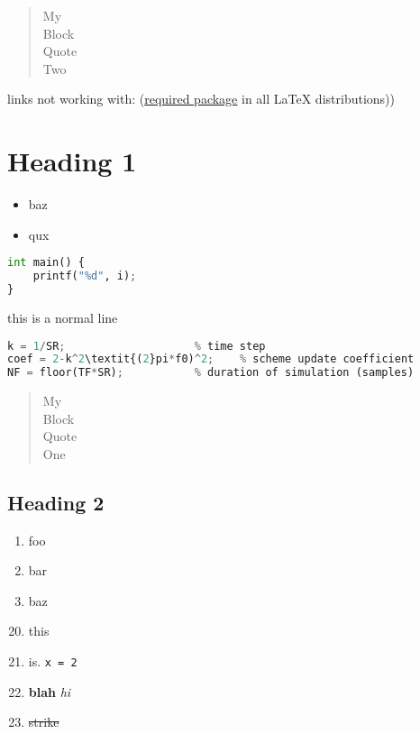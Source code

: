 \documentclass{article}
\begin{document}
 
\setcounter{secnumdepth}{0}

\begin{quote}
    My\\
    Block\\
    Quote\\
    Two
\end{quote}

links not working with: (\href{https://ctan.org/pkg/required}{required package} in all LaTeX distributions))
\section{Heading 1}

\begin{itemize}
    \item baz
    \item qux
\end{itemize}

\begin{lstlisting}[language=python, style=myStyle]
int main() {
    printf("%d", i);
}
\end{lstlisting}

this is a normal line
\begin{lstlisting}[language=python, style=myStyle]
% derived parameters
k = 1/SR;                    % time step
coef = 2-k^2\textit{(2}pi*f0)^2;    % scheme update coefficient
NF = floor(TF*SR);           % duration of simulation (samples)
\end{lstlisting}

\begin{quote}
    My\\
    Block\\
    Quote\\
    One
\end{quote}

\subsection{Heading 2}

\begin{enumerate}
    \setcounter{enumi}{0}
    \item foo
    \item bar
    \item baz
\end{enumerate}

\begin{enumerate}
    \setcounter{enumi}{19}
    \item this
    \item is. \verb|x = 2|
    \item \textbf{blah} \textit{hi}
    \item \sout{strike}
\end{enumerate}
\end{document}
